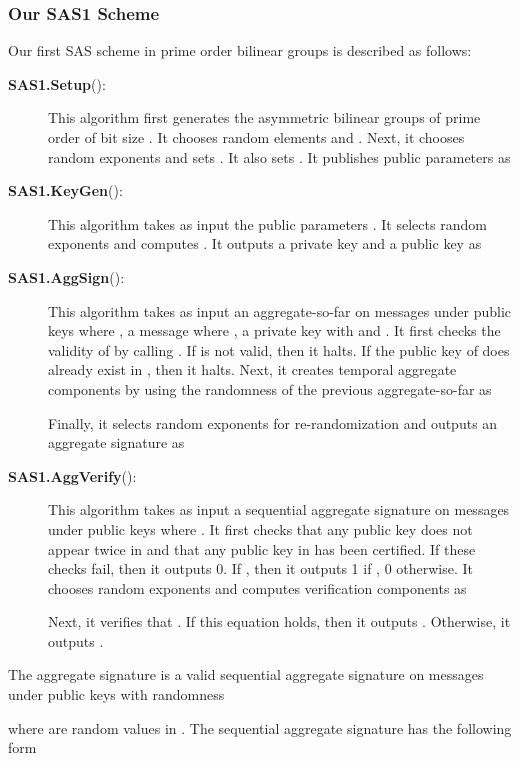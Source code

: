 \documentclass[11pt,letterpaper]{article}
\begin{document}
\subsubsection{Our SAS1 Scheme}

Our first SAS scheme in prime order bilinear groups is described as follows:

\begin{description}
\item [\textbf{SAS1.Setup}():] This algorithm first generates
    the asymmetric bilinear groups  of prime order  of bit
    size . It chooses random elements  and
    . Next, it chooses random exponents
     and sets . It
    also sets . It
    publishes public parameters as
    

\item [\textbf{SAS1.KeyGen}():] This algorithm takes as input the
    public parameters . It selects random exponents  and computes . It outputs
    a private key  and a public key as
    

\item [\textbf{SAS1.AggSign}():] This
    algorithm takes as input an aggregate-so-far  on messages  under
    public keys  where , a message  where ,
    a private key  with 
    and . It first checks the validity of  by calling
    . If  is not
    valid, then it halts. If the public key  of  does already exist
    in , then it halts. Next, it creates temporal aggregate
    components by using the randomness of the previous aggregate-so-far as
    
    Finally, it selects random exponents  for
    re-randomization and outputs an aggregate signature as
    

\item [\textbf{SAS1.AggVerify}():] This algorithm
    takes as input a sequential aggregate signature  on messages
     under public keys  where . It first
    checks that any public key does not appear twice in  and
    that any public key in  has been certified. If these checks
    fail, then it outputs 0. If , then it outputs 1 if , 0 otherwise. It chooses random exponents  and
    computes verification components as
    
    Next, it verifies that . If this equation holds, then it outputs . Otherwise, it
    outputs .
\end{description}

The aggregate signature  is a valid sequential aggregate signature on
messages  under public keys  with randomness
    
where  are random values in . The sequential aggregate
signature has the following form
    
\end{document}
